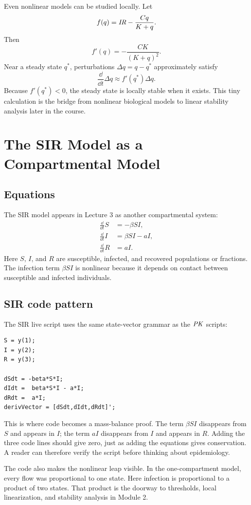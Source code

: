 \documentclass[a4paper]{article}
\newcommand{\ddt}{\frac{\dd}{\dd t}}
\newcommand{\PK}{\ensuremath{\pksym{PK}}}
\newcommand{\IRate}{\ensuremath{\pksym{IR}}}
\begin{document}
Even nonlinear models can be studied locally. Let
\[
  f(q)=\IRate-\frac{Cq}{K+q}.
\]
Then
\[
  f'(q)=-\frac{CK}{(K+q)^2}.
\]
Near a steady state \(q^*\), perturbations \(\Delta q=q-q^*\) approximately satisfy
\[
  \ddt \Delta q
  \approx
  f'(q^*)\Delta q.
\]
Because \(f'(q^*)<0\), the steady state is locally stable when it exists. This tiny calculation is the bridge from nonlinear biological models to linear stability analysis later in the course.

\section{The SIR Model as a Compartmental Model}

\subsection{Equations}

The SIR model appears in Lecture 3 as another compartmental system:
\[
  \begin{aligned}
  \ddt S&=-\beta SI,\\
  \ddt I&=\beta SI-aI,\\
  \ddt R&=aI.
  \end{aligned}
\]
Here \(S\), \(I\), and \(R\) are susceptible, infected, and recovered populations or fractions. The infection term \(\beta SI\) is nonlinear because it depends on contact between susceptible and infected individuals.

\subsection{SIR code pattern}

The SIR live script uses the same state-vector grammar as the \PK{} scripts:
\begin{verbatim}
S = y(1);
I = y(2);
R = y(3);

dSdt = -beta*S*I;
dIdt =  beta*S*I - a*I;
dRdt =  a*I;
derivVector = [dSdt,dIdt,dRdt]';
\end{verbatim}
This is where code becomes a mass-balance proof. The term \(\beta SI\) disappears from \(S\) and appears in \(I\); the term \(aI\) disappears from \(I\) and appears in \(R\). Adding the three code lines should give zero, just as adding the equations gives conservation. A reader can therefore verify the script before thinking about epidemiology.

The code also makes the nonlinear leap visible. In the one-compartment model, every flow was proportional to one state. Here infection is proportional to a product of two states. That product is the doorway to thresholds, local linearization, and stability analysis in Module 2.
\end{document}
